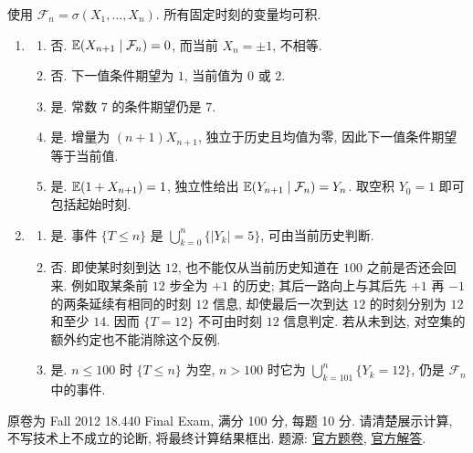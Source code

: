 \begin{solution}
使用 $\mathcal F_n=\sigma(X_1,\ldots,X_n)$. 所有固定时刻的变量均可积.
\begin{enumerate}[label=\arabic*.]
\item
\begin{enumerate}[label=(\alph*)]
\item\label{sol:fe2011q10-1-a} 否. $\mathbb E(X_{n+1}\mid\mathcal F_n)=0$, 而当前 $X_n=\pm1$, 不相等.
\item\label{sol:fe2011q10-1-b} 否. 下一值条件期望为 $1$, 当前值为 $0$ 或 $2$.
\item\label{sol:fe2011q10-1-c} 是. 常数 $7$ 的条件期望仍是 $7$.
\item\label{sol:fe2011q10-1-d} 是. 增量为 $(n+1)X_{n+1}$, 独立于历史且均值为零, 因此下一值条件期望等于当前值.
\item\label{sol:fe2011q10-1-e} 是. $\mathbb E(1+X_{n+1})=1$, 独立性给出 $\mathbb E(Y_{n+1}\mid\mathcal F_n)=Y_n$. 取空积 $Y_0=1$ 即可包括起始时刻.
\end{enumerate}
\item
\begin{enumerate}[label=(\alph*)]
\item\label{sol:fe2011q10-2-a} 是. 事件 $\{T\le n\}$ 是 $\bigcup_{k=0}^n\{|Y_k|=5\}$, 可由当前历史判断.
\item\label{sol:fe2011q10-2-b} 否. 即使某时刻到达 $12$, 也不能仅从当前历史知道在 $100$ 之前是否还会回来. 例如取某条前 $12$ 步全为 $+1$ 的历史; 其后一路向上与其后先 $+1$ 再 $-1$ 的两条延续有相同的时刻 $12$ 信息, 却使最后一次到达 $12$ 的时刻分别为 $12$ 和至少 $14$. 因而 $\{T=12\}$ 不可由时刻 $12$ 信息判定. 若从未到达, 对空集的额外约定也不能消除这个反例.
\item\label{sol:fe2011q10-2-c} 是. $n\le100$ 时 $\{T\le n\}$ 为空, $n>100$ 时它为 $\bigcup_{k=101}^n\{Y_k=12\}$, 仍是 $\mathcal F_n$ 中的事件.
\end{enumerate}
\end{enumerate}
\end{solution}

原卷为 Fall 2012 18.440 Final Exam, 满分 100 分, 每题 10 分. 请清楚展示计算, 不写技术上不成立的论断, 将最终计算结果框出.
题源: \href{https://ocw.mit.edu/courses/18-600-probability-and-random-variables-fall-2019/resources/mit18_600f19_final_2012/}{官方题卷}, \href{https://ocw.mit.edu/courses/18-600-probability-and-random-variables-fall-2019/resources/mit18_600f19_final_2012_soln/}{官方解答}.

